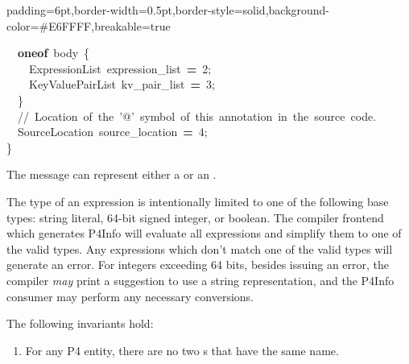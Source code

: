 \documentclass[11pt]{article}
\begin{document}
{\begin{mdbmargintb}{6pt}{6pt}
\begin{mdblock}{padding=6pt,border-width=0.5pt,border-style=solid,background-color=\#E6FFFF,breakable=true}
\begin{mdpre}
{{~~{\bfseries{oneof}}~body~\{\\
~~~~ExpressionList~expression\_list~{\bfseries{=}}~{2};\\
~~~~KeyValuePairList~kv\_pair\_list~{\bfseries{=}}~{3};\\
~~\}\\
~~{//~Location~of~the~'@'~symbol~of~this~annotation~in~the~source~code.}\\
~~SourceLocation~source\_location~{\bfseries{=}}~{4};\\
\}}}%
\end{mdpre}%
\end{mdblock}%
\end{mdbmargintb}%

\noindent{}The  message can represent either a 
or an .%

The type of an expression is intentionally limited to one of the following
base types: string literal, 64-bit signed integer, or boolean. The 
compiler frontend which generates P4Info will evaluate all expressions and
simplify them to one of the valid types. Any expressions which don't match one
of the valid types will generate an error. For integers exceeding 64 bits,
besides issuing an error, the compiler \emph{may} print a suggestion to use a
string representation, and the P4Info consumer may perform any necessary
conversions.%

The following invariants hold:%

\begin{enumerate}%

\item{}
For any P4 entity, there are no two s that have the
same name.%


\end{enumerate}}
\end{document}
